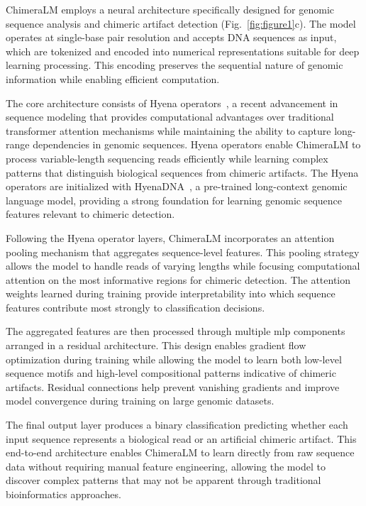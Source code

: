 \documentclass[pdflatex,sn-nature]{sn-jnl}%
\theoremstyle{thmstyleone}%
\theoremstyle{thmstyletwo}%
\theoremstyle{thmstylethree}%
\begin{document}
ChimeraLM employs a neural architecture specifically designed for genomic sequence analysis and chimeric artifact detection (Fig.~\ref{fig:figure1}c).
The model operates at single-base pair resolution and accepts DNA sequences as input, which are tokenized and encoded into numerical representations suitable for deep learning processing.
This encoding preserves the sequential nature of genomic information while enabling efficient computation.

The core architecture consists of Hyena operators~\cite{Poli2023HyenaHT}, a recent advancement in sequence modeling that provides computational advantages over traditional transformer attention mechanisms while maintaining the ability to capture long-range dependencies in genomic sequences.
Hyena operators enable ChimeraLM to process variable-length sequencing reads efficiently while learning complex patterns that distinguish biological sequences from chimeric artifacts.
The Hyena operators are initialized with HyenaDNA~\cite{nguyen2023hyenadna}, a pre-trained long-context genomic language model, providing a strong foundation for learning genomic sequence features relevant to chimeric detection.

Following the Hyena operator layers, ChimeraLM incorporates an attention pooling mechanism that aggregates sequence-level features.
This pooling strategy allows the model to handle reads of varying lengths while focusing computational attention on the most informative regions for chimeric detection.
The attention weights learned during training provide interpretability into which sequence features contribute most strongly to classification decisions.

The aggregated features are then processed through multiple \gls{mlp} components arranged in a residual architecture.
This design enables gradient flow optimization during training while allowing the model to learn both low-level sequence motifs and high-level compositional patterns indicative of chimeric artifacts.
Residual connections help prevent vanishing gradients and improve model convergence during training on large genomic datasets.

The final output layer produces a binary classification predicting whether each input sequence represents a biological read or an artificial chimeric artifact.
This end-to-end architecture enables ChimeraLM to learn directly from raw sequence data without requiring manual feature engineering, allowing the model to discover complex patterns that may not be apparent through traditional bioinformatics approaches.
\end{document}
